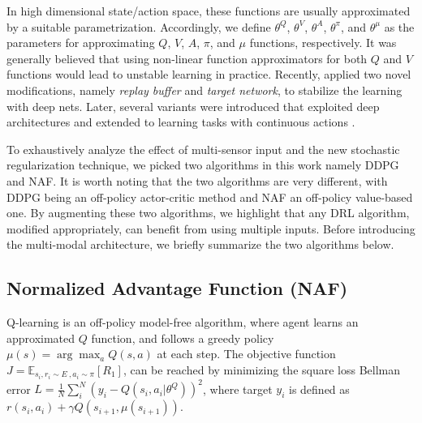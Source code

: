 \documentclass[../thesis.tex]{subfiles}
\begin{document}
In high dimensional state/action space, these functions are usually approximated by a suitable parametrization. Accordingly, we define $\theta^Q$, $\theta^V$, $\theta^A$, $\theta^\pi$, and $\theta^\mu$ as the parameters for approximating $Q$, $V$, $A$, $\pi$, and $\mu$ functions, respectively. It was generally believed that using non-linear function approximators for both $Q$ and $V$ functions would lead to unstable learning in practice. Recently, \citet{mnih2013playing} applied two novel modifications, namely \textit{replay buffer} and \textit{target network}, to stabilize the learning with deep nets. Later, several variants were introduced that exploited deep architectures and extended to learning tasks with continuous actions \cite{DBLP:journals/corr/LillicrapHPHETS15,A3C,CDQN,TRPO}. 

To exhaustively analyze the effect of multi-sensor input and the new stochastic regularization technique, we picked two algorithms in this work namely DDPG and NAF. It is worth noting that the two algorithms are very different, with DDPG being an off-policy actor-critic method and NAF an off-policy value-based one. By augmenting these two algorithms, we highlight that any DRL algorithm, modified appropriately, can benefit from using multiple inputs. Before introducing the multi-modal architecture, we briefly summarize the two algorithms below.


\subsection{Normalized Advantage Function (NAF)} 
\label{sec:CDQN}

Q-learning \cite{sutton1999policy} is an off-policy model-free algorithm, where agent learns an approximated $Q$ function, and follows a greedy policy $\mu(s)=\arg\max_aQ(s,a)$ at each step. The objective function 
$J = \mathbb{E}_{s_i, r_i \sim E~, a_i \sim \pi}[R_1]$, can be reached by minimizing the square loss Bellman error $L = \frac{1}{N} \sum_i^N (y_i-Q(s_i,a_i|\theta^Q))^2$,
where target $y_i$ is defined as $r(s_i,a_i) + \gamma Q(s_{i+1},\mu(s_{i+1}))$.
\end{document}
